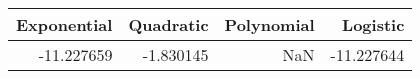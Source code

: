 \begin{tabular}{rrrr}
\toprule
 Exponential &  Quadratic &  Polynomial &   Logistic \\
\midrule
  -11.227659 &  -1.830145 &         NaN & -11.227644 \\
\bottomrule
\end{tabular}
